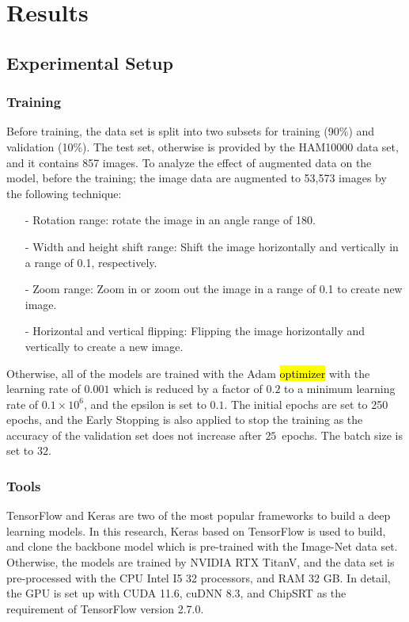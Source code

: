 \documentclass[sensors,article,accept,pdftex,moreauthors]{Definitions/mdpi}
\begin{document}
	\section{Results}
	\subsection{Experimental Setup}
	\subsubsection{Training}
	Before training, the data set is split into two subsets for training (90\%) and validation (10\%). The test set, otherwise is  provided by the HAM10000 data set, and it contains 857 images. To analyze the effect of augmented data on the model, before the training; the image data are augmented to 53,573 images by the following technique:
	
	\begin{itemize}
	\item[-] Rotation range: rotate the image in an {angle range of 180}. 
	\item[-] Width and height shift range: Shift the image horizontally and vertically {in a range of 0.1}, respectively. 
	\item[-] Zoom range:  Zoom in or zoom out the image {in a range of 0.1} to create new image. 
	\item[-] Horizontal and vertical flipping: Flipping the image horizontally and vertically to create a new image.
	\end{itemize}
	
	Otherwise, all of the models are trained with the Adam \hl{optimizer} %
 \cite{6980} with the learning rate of $0.001$ which is reduced by a factor of $0.2$ to a minimum learning rate of $0.1 \times 10^6$, and the epsilon is set to $0.1$. The initial epochs are set to 250 epochs, and the Early Stopping is also applied to stop the training as the accuracy of the validation set does not increase after $25$~epochs. The batch size is set to $32$.
	
	\subsubsection{Tools}
	TensorFlow and Keras are two of the most popular frameworks to build a deep learning models. In this research, Keras based on TensorFlow is used to build, and clone the backbone model which is pre-trained with the Image-Net data set. Otherwise, the models are trained by NVIDIA RTX TitanV, and the data set is pre-processed with the CPU Intel I5 32 processors, and RAM 32 GB. In detail, the GPU is set up with CUDA 11.6, cuDNN 8.3, and ChipSRT as the requirement of TensorFlow version 2.7.0.
\end{document}
